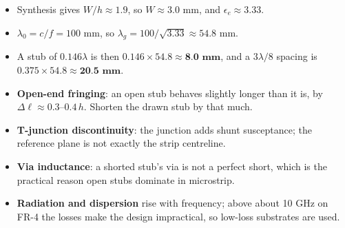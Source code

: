 {\begin{itemize}
  \item Synthesis gives $W/h \approx 1.9$, so $W \approx 3.0$ mm, and
    $\epsilon_e \approx 3.33$.
  \item $\lambda_0 = c/f = 100$ mm, so
    $\lambda_g = 100/\sqrt{3.33} \approx 54.8$ mm.
  \item A stub of $0.146\lambda$ is then $0.146 \times 54.8 \approx \textbf{8.0 mm}$, and a
    $3\lambda/8$ spacing is $0.375 \times 54.8 \approx \textbf{20.5 mm}$.
\end{itemize}
\begin{itemize}
  \item \textbf{Open-end fringing}: an open stub behaves slightly longer than it is, by
    $\Delta \ell \approx 0.3\text{--}0.4\,h$. Shorten the drawn stub by that much.
  \item \textbf{T-junction discontinuity}: the junction adds shunt susceptance; the
    reference plane is not exactly the strip centreline.
  \item \textbf{Via inductance}: a shorted stub's via is not a perfect short, which is the
    practical reason open stubs dominate in microstrip.
  \item \textbf{Radiation and dispersion} rise with frequency; above about 10 GHz on FR-4
    the losses make the design impractical, so low-loss substrates are used.
\end{itemize}}

\vspace{2pt}



